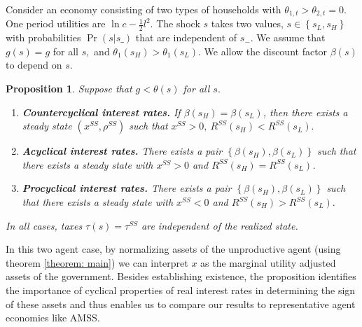 \documentclass[thmsb,11pt]{article}
\newtheorem{proposition}{Proposition}
\begin{document}
Consider an economy consisting of  two types of households with $%
\theta _{1,t}>\theta _{2,t}=0$. One period utilities are $\ln c-\frac{1}{2}%
l^{2}.$ The shock $s$  takes  two values, $s\in \left\{
s_{L},s_{H}\right\} $ with probabilities $\Pr \left( s|s\_\right) $ that are
independent of $s_{-}.$ We assume that $g\left( s\right) =g$ for all $s,$
and $\theta _{1}\left( s_{H}\right) >\theta _{1}\left( s_{L}\right) .$ We allow the discount factor $\beta(s)$ to depend on  $s.$

\smallskip

\begin{proposition}
\label{prop: long run forces}\smallskip Suppose that $g<\theta (s)$ for all $%
s.$

\begin{enumerate}
\item \textbf{Countercyclical interest rates.} If $\beta \left( s_{H}\right) =\beta \left( s_{L}\right)$, then
there exists a steady state $\left( x^{SS},\rho ^{SS}\right) $ such that $%
x^{SS}>0,\ R^{SS}\left( s_{H}\right) <R^{SS}\left( s_{L}\right) .$
\item \textbf{Acyclical interest rates.}  There exists a pair $\left\{ \beta \left( s_{H}\right) ,\beta \left( s_{L}\right)
\right\} $ such that there exists a steady state with $x^{SS}>0$ and $R^{SS}\left(
s_{H}\right) =R^{SS}\left( s_{L}\right)$.
\item \textbf{Procyclical interest rates.} There exists a pair  $\left\{ \beta \left( s_{H}\right) ,\beta \left( s_{L}\right)
\right\} $ such that there exists a steady state with $x^{SS}<0$ and  $R^{SS}\left( s_{H}\right) >R^{SS}\left( s_{L}\right) .$
\end{enumerate}
In all cases, taxes $\tau(s)=\tau^{SS}$ are independent of the realized state.
\end{proposition}


In this two agent case, by normalizing assets of the unproductive agent (using theorem \ref{theorem: main}) we can interpret $x$ as the marginal utility adjusted assets of the government. Besides establishing existence, the proposition identifies the importance of cyclical properties of real interest rates in determining the sign of these assets and thus enables us to compare our results to representative agent economies like AMSS.
\end{document}

